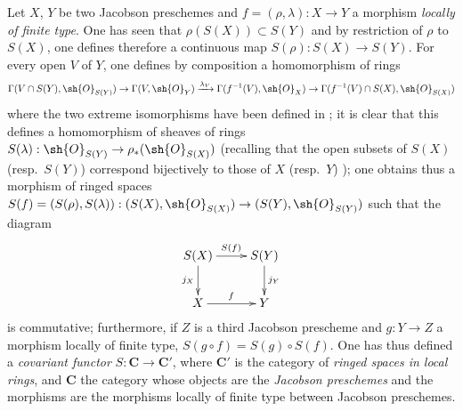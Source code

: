 \begin{env}[10.9.2]
\label{IV.10.9.2}
Let $X$, $Y$ be two Jacobson preschemes and $f=(\rho,\lambda):X\to Y$ a morphism \emph{locally of finite type}.
One has seen  that $\rho(S(X))\subset S(Y)$ and by restriction of $\rho$ to $S(X)$, one defines therefore a continuous map $S(\rho):S(X)\to S(Y)$.
For every open $V$ of $Y$, one defines by composition a homomorphism of rings
\[
  \Gamma(V\cap S(Y),\sh{O}_{S(Y)})\to\Gamma(V,\sh{O}_Y)\xrightarrow{\lambda_V}\Gamma(f^{-1}(V),\sh{O}_X)\to\Gamma(f^{-1}(V)\cap S(X),\sh{O}_{S(X)})
\]
where the two extreme isomorphisms have been defined in ; it is clear that this defines a homomorphism of sheaves of rings $S(\lambda):\sh{O}_{S(Y)}\to\rho_*(\sh{O}_{S(X)})$ (recalling that the open subsets of $S(X)$ (resp.\ $S(Y)$) correspond bijectively to those of $X$ (resp.\ $Y$) ); one obtains thus a morphism of ringed spaces $S(f)=(S(\rho),S(\lambda)):(S(X),\sh{O}_{S(X)})\to(S(Y),\sh{O}_{S(Y)})$ such that the diagram
\[
  \xymatrix{
    S(X)\ar[r]^{S(f)}\ar[d]_{j_X} & S(Y)\ar[d]^{j_Y}\\
    X\ar[r]^{f} & Y
  }
\]
is commutative; furthermore, if $Z$ is a third Jacobson prescheme and $g:Y\to Z$ a morphism locally of finite type, $S(g\circ f)=S(g)\circ S(f)$.
One has thus defined a \emph{covariant functor} $S:\mathbf{C}\to\mathbf{C}'$, where $\mathbf{C}'$ is the category of \emph{ringed spaces in local rings}, and $\mathbf{C}$ the category whose objects are the \emph{Jacobson preschemes} and the morphisms are the morphisms locally of finite type between Jacobson preschemes.
\end{env}

